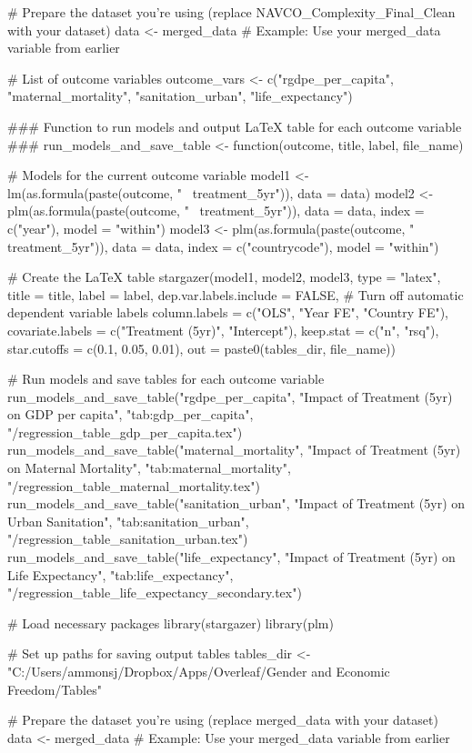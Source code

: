 # Prepare the dataset you're using (replace NAVCO_Complexity_Final_Clean with your dataset)
data <- merged_data  # Example: Use your merged_data variable from earlier

# List of outcome variables
outcome_vars <- c("rgdpe_per_capita", "maternal_mortality", "sanitation_urban", "life_expectancy")

### Function to run models and output LaTeX table for each outcome variable ###
run_models_and_save_table <- function(outcome, title, label, file_name) {
  # Models for the current outcome variable
  model1 <- lm(as.formula(paste(outcome, "~ treatment_5yr")), data = data)
  model2 <- plm(as.formula(paste(outcome, "~ treatment_5yr")), data = data, index = c("year"), model = "within")
  model3 <- plm(as.formula(paste(outcome, "~ treatment_5yr")), data = data, index = c("countrycode"), model = "within")

  # Create the LaTeX table
  stargazer(model1, model2, model3,
            type = "latex",
            title = title,
            label = label,
            dep.var.labels.include = FALSE,  # Turn off automatic dependent variable labels
            column.labels = c("OLS", "Year FE", "Country FE"),
            covariate.labels = c("Treatment (5yr)", "Intercept"),
            keep.stat = c("n", "rsq"),
            star.cutoffs = c(0.1, 0.05, 0.01),
            out = paste0(tables_dir, file_name))
}

# Run models and save tables for each outcome variable
run_models_and_save_table("rgdpe_per_capita", "Impact of Treatment (5yr) on GDP per capita", "tab:gdp_per_capita", "/regression_table_gdp_per_capita.tex")
run_models_and_save_table("maternal_mortality", "Impact of Treatment (5yr) on Maternal Mortality", "tab:maternal_mortality", "/regression_table_maternal_mortality.tex")
run_models_and_save_table("sanitation_urban", "Impact of Treatment (5yr) on Urban Sanitation", "tab:sanitation_urban", "/regression_table_sanitation_urban.tex")
run_models_and_save_table("life_expectancy", "Impact of Treatment (5yr) on Life Expectancy", "tab:life_expectancy", "/regression_table_life_expectancy_secondary.tex")

# Load necessary packages
library(stargazer)
library(plm)

# Set up paths for saving output tables
tables_dir <- "C:/Users/ammonsj/Dropbox/Apps/Overleaf/Gender and Economic Freedom/Tables"

# Prepare the dataset you're using (replace merged_data with your dataset)
data <- merged_data  # Example: Use your merged_data variable from earlier

